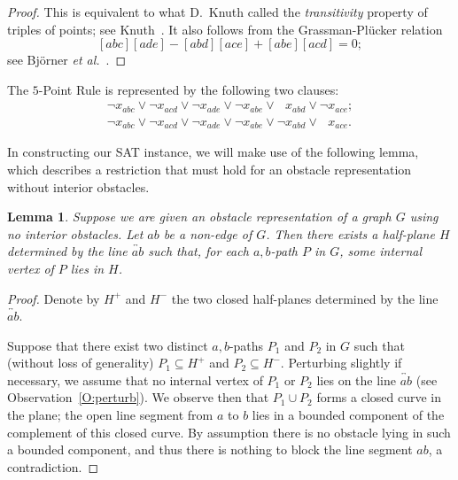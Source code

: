 \documentclass[12pt]{amsart}
\newtheorem{lemma}[theorem]{Lemma}
\theoremstyle{remark}
\begin{document}
\begin{proof}
This is equivalent to what D.~Knuth
called the \emph{transitivity}
property of triples of points;
see Knuth~\cite[p.~4, Axiom~5]{Knu92}.
It also
follows from the Grassman-Pl\"{u}cker relation
\[
[abc][ade]-[abd][ace]+[abe][acd] = 0;
\]
see Bj\"{o}rner \textit{et al.}~\cite[pp.~6--7]{BjoLasStu99}.
\end{proof}



The $5$-Point Rule
is  represented by the following two clauses:
\begin{gather}
\label{Cl:5pt1}
\neg x_{abc} \vee \neg x_{acd} \vee \neg x_{ade} \vee \neg x_{abe}
  \vee \phantom{\neg} x_{abd} \vee \neg x_{ace};\\
\label{Cl:5pt2}
\neg x_{abc} \vee \neg x_{acd} \vee \neg x_{ade} \vee \neg x_{abe}
  \vee \neg x_{abd} \vee \phantom{\neg} x_{ace}.
\end{gather}


In constructing our SAT instance, we will make use of
the following lemma,
which describes a restriction
that must hold for an obstacle representation
without interior obstacles.

\begin{lemma} \label{L:extobs}
Suppose we are given an obstacle representation of a graph $G$
using no interior obstacles.
Let $ab$ be a non-edge of $G$.
Then there exists a half-plane $H$ determined by
the line $\overleftrightarrow{ab}$
such that, for each $a,b$-path $P$ in $G$,
some internal vertex of $P$ lies in $H$.
\end{lemma}

\begin{proof}
Denote by $H^{+}$ and $H^{-}$ the two closed half-planes
determined by the line $\overleftrightarrow{ab}$.

Suppose that there exist two distinct $a,b$-paths $P_{1}$ and $P_{2}$
in $G$
such that (without loss of generality)
$P_{1}\subseteq H^{+}$ and $P_{2}\subseteq H^{-}$.
Perturbing slightly if necessary,
we assume that no internal vertex of $P_{1}$ or $P_{2}$
lies on the line $\overleftrightarrow{ab}$
(see Observation~\ref{O:perturb}).
We observe then that $P_{1}\cup P_{2}$ forms a closed curve in the plane;
the open line segment from $a$ to $b$ lies in a bounded component
of the complement of this closed curve.
By assumption there is no obstacle lying in such a bounded component,
and thus there is nothing to block the line segment $ab$,
a contradiction.
\end{proof}
\end{document}
